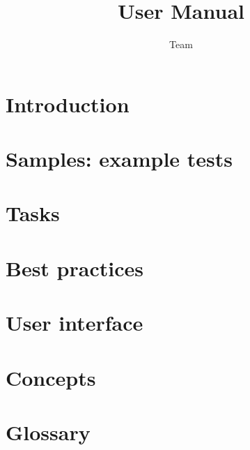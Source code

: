 \documentclass[en,a4paper,twoside,manual,guidancer]{bxreport}
\begin{document}
\title{\jb{} User Manual}
\author*{\jb{} Team}{}
\maketitle



\tableofcontents
\renewcommand{\bxcomment}[2]{}%
\clearpage
\chapter{Introduction}
\label{Introduction}


\clearpage
\chapter{Samples: example tests}
\label{Samples}


\clearpage
 \chapter{Tasks}
 \label{Tasks}


\clearpage
\chapter{Best practices}
\label{BestPractices}


\clearpage
\chapter{User interface}
\label{ChapterUserInterface}


\clearpage
\chapter{Concepts}
\label{Concepts}


\clearpage
\chapter{Glossary}
\label{Glossary}


\clearpage
\printindex
\end{document}
